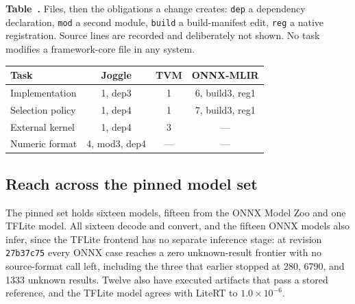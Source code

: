 \documentclass[sigplan,anonymous,review]{acmart}
\begin{document}
\begin{center}
\small
{}\label{tab:scope}
\textbf{Table~\thetable.} Files, then the obligations a change creates: \texttt{dep} a dependency declaration, \texttt{mod} a second module, \texttt{build} a build-manifest edit, \texttt{reg} a native registration. Source lines are recorded and deliberately not shown. No task modifies a framework-core file in any system.

\vspace{2pt}
{\footnotesize
\begin{tabular}{@{}lccc@{}}
\toprule
Task & Joggle & TVM & ONNX-MLIR \\
\midrule
Implementation   & 1, dep3 & 1 & 6, build3, reg1 \\
Selection policy & 1, dep4 & 1 & 7, build3, reg1 \\
External kernel  & 1, dep4 & 3 & --- \\
Numeric format   & 4, mod3, dep4 & --- & --- \\
\bottomrule
\end{tabular}}
\end{center}

\subsection{Reach across the pinned model set}
\label{sec:eval-reach}
The pinned set holds sixteen models, fifteen from the ONNX Model Zoo and one
TFLite model. All sixteen decode and convert, and the fifteen ONNX models also
infer, since the TFLite frontend has no separate inference stage: at revision
\texttt{27b37c75} every ONNX case reaches a zero unknown-result frontier with no
source-format call left, including the three that earlier stopped at 280, 6790,
and 1333 unknown results. Twelve also have executed artifacts that pass a stored
reference, and the TFLite model agrees with LiteRT to $1.0\times10^{-6}$.
\end{document}
